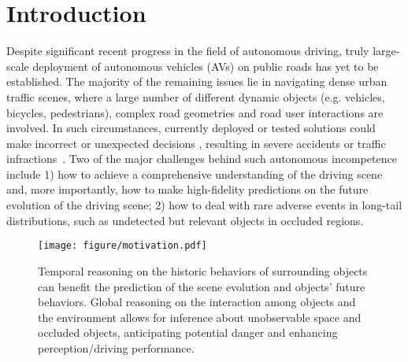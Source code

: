 \documentclass[10pt,twocolumn,letterpaper]{article}
\begin{document}
\section{Introduction}
Despite significant recent progress in the field of autonomous driving, truly large-scale deployment of autonomous vehicles (AVs) on public roads has yet to be established. The majority of the remaining issues lie in navigating dense urban traffic scenes, where a large number of different dynamic objects (e.g. vehicles, bicycles, pedestrians), complex road geometries and road user interactions are involved. In such circumstances, currently deployed or tested solutions could make incorrect or unexpected decisions , resulting in severe accidents or traffic infractions~\cite{tesla, uber, leaderboard}. Two of the major challenges behind such autonomous incompetence include 1) how to achieve a comprehensive understanding of the driving scene and, more importantly, how to make high-fidelity predictions on the future evolution of the driving scene; 2) how to deal with rare adverse events in long-tail distributions, such as undetected but relevant objects in occluded regions.

\begin{figure}[t]
    \centering
    \texttt{[image: figure/motivation.pdf]}
    \vspace{-0.5em}
    \caption{Temporal reasoning on the historic behaviors of surrounding objects can benefit the prediction of the scene evolution and objects' future behaviors. Global reasoning on the interaction among objects and the environment allows for inference about unobservable space and occluded objects, anticipating potential danger and enhancing perception/driving performance.}
    \label{fig:pipeline}
    \vspace{-1em}
\end{figure}
\end{document}
